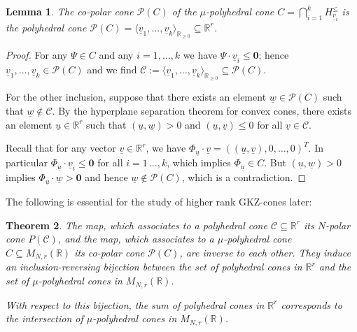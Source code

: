 \documentclass[12pt, a4article]{amsart}   	%
\numberwithin{equation}{section}
\theoremstyle{plain}
\newtheorem{theorem}{Theorem}[section]
\newtheorem{lemma}[theorem]{Lemma}
\theoremstyle{definition}
\newcommand{\R}{{\mathbb R}}
\newcommand{\mcC}{{\mathcal C}}
\newcommand{\mcP}{{\mathcal P}}
\newcommand{\uu}{{\underline u}}
\newcommand{\uv}{{\underline v}}
\newcommand{\uw}{{\underline w}}
\begin{document}
\begin{lemma}\label{lem:copolar:cone2}
The co-polar  cone $\mcP(C)$ of the $\mu$-polyhedral cone $C=\bigcap_{i=1}^k H_{\uv_i}^\leq$  is the polyhedral cone 
$\mcP(C)=\langle \uv_1,\ldots,\uv_k\rangle_{\R_{\geq 0}}\subseteq\mathbb R^r$.
\end{lemma}
\begin{proof}
For any $\Psi\in C$ and any $i=1,\ldots,k$ we have $\Psi\cdot\uv_i \leq\mathbf 0$;
hence $\uv_1,\ldots,\uv_k\in\mcP(C)$ and we find $\mcC:=\langle \uv_1,\ldots, \uv_k\rangle_{\R_ { \geq 0}}\subseteq\mcP(C)$.

For the other inclusion, suppose that there exists an element $\uw\in\mcP(C)$ such that $\uw\not\in\mcC$. By the hyperplane separation theorem for convex cones, there exists an element $\uu\in \mathbb R^r$ such that $(\uu,\uw)>0$ and $(\uu,\uv)\leq 0$ for all $\uv\in\mcC$.

Recall that for any vector $\uv\in \mathbb R^r$, we have $\Phi_{\uu}\cdot\uv = ((\uu,\uv),0,\ldots,0)^T$. 
In particular $\Phi_{\uu}\cdot \uv_i\leq\mathbf 0$ for all $i=1\,\ldots,k$, which implies $\Phi_{\uu}\in C$. But $(\uu,\uw)>0$ implies $\Phi_{\uu}\cdot \uw>\mathbf 0$ and hence $\uw\notin\mcP(C)$, which is a contradiction.
\end{proof}

The following is essential for the study of higher rank GKZ-cones later:

\begin{theorem}\label{thm:polar:copolar}
The map, which associates to a polyhedral cone  $\mcC\subseteq \mathbb R^r$ its $N$-polar cone $P(\mcC)$, and the map, which associates to a $\mu$-polyhedral cone $C\subseteq M_{N,r}(\mathbb R)$ 
its co-polar cone $\mcP(C)$, are inverse to each other. 
They induce an inclusion-reversing bijection between the set of polyhedral cones in $\mathbb R^r$ and
the set of $\mu$-polyhedral cones in $M_{N,r}(\mathbb R)$. 

With respect to this bijection, the sum of polyhedral cones in $\mathbb R^r$ corresponds to the intersection of $\mu$-polyhedral cones in $M_{N,r}(\mathbb R)$.
\end{theorem}
\end{document}
